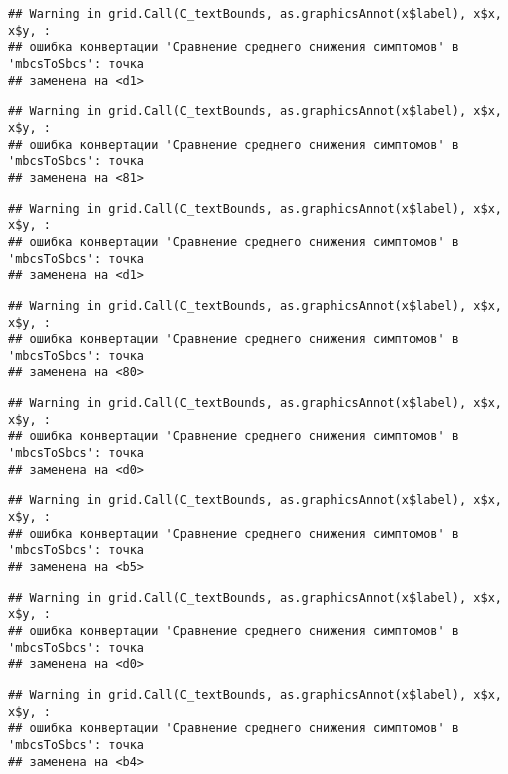 \documentclass[
]{article}
\begin{document}
\begin{verbatim}
## Warning in grid.Call(C_textBounds, as.graphicsAnnot(x$label), x$x, x$y, :
## ошибка конвертации 'Сравнение среднего снижения симптомов' в 'mbcsToSbcs': точка
## заменена на <d1>
\end{verbatim}

\begin{verbatim}
## Warning in grid.Call(C_textBounds, as.graphicsAnnot(x$label), x$x, x$y, :
## ошибка конвертации 'Сравнение среднего снижения симптомов' в 'mbcsToSbcs': точка
## заменена на <81>
\end{verbatim}

\begin{verbatim}
## Warning in grid.Call(C_textBounds, as.graphicsAnnot(x$label), x$x, x$y, :
## ошибка конвертации 'Сравнение среднего снижения симптомов' в 'mbcsToSbcs': точка
## заменена на <d1>
\end{verbatim}

\begin{verbatim}
## Warning in grid.Call(C_textBounds, as.graphicsAnnot(x$label), x$x, x$y, :
## ошибка конвертации 'Сравнение среднего снижения симптомов' в 'mbcsToSbcs': точка
## заменена на <80>
\end{verbatim}

\begin{verbatim}
## Warning in grid.Call(C_textBounds, as.graphicsAnnot(x$label), x$x, x$y, :
## ошибка конвертации 'Сравнение среднего снижения симптомов' в 'mbcsToSbcs': точка
## заменена на <d0>
\end{verbatim}

\begin{verbatim}
## Warning in grid.Call(C_textBounds, as.graphicsAnnot(x$label), x$x, x$y, :
## ошибка конвертации 'Сравнение среднего снижения симптомов' в 'mbcsToSbcs': точка
## заменена на <b5>
\end{verbatim}

\begin{verbatim}
## Warning in grid.Call(C_textBounds, as.graphicsAnnot(x$label), x$x, x$y, :
## ошибка конвертации 'Сравнение среднего снижения симптомов' в 'mbcsToSbcs': точка
## заменена на <d0>
\end{verbatim}

\begin{verbatim}
## Warning in grid.Call(C_textBounds, as.graphicsAnnot(x$label), x$x, x$y, :
## ошибка конвертации 'Сравнение среднего снижения симптомов' в 'mbcsToSbcs': точка
## заменена на <b4>
\end{verbatim}
\end{document}
